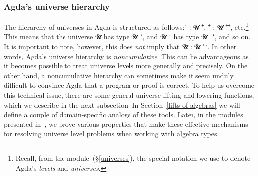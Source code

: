 \subsubsection{Agda's universe hierarchy}\label{agdas-universe-hierarchy}



The hierarchy of universes in Agda is structured as follows: \af ̇ \as : \ab 𝓤 \af ⁺\af ̇,
 \af ⁺\af ̇ \as : \ab 𝓤 \af ⁺\af ⁺\af ̇, etc.\footnote{Recall, from the  module~(\S\ref{universes}), the special notation we use to denote Agda's \textit{levels} and \textit{universes}.}
This means that the universe \ab 𝓤\af ̇ has type \ab 𝓤  \af ⁺\af ̇, and 𝓤 \af ⁺\af ̇ has type \ab 𝓤 \af ⁺\af ⁺\af ̇, and so on.  It is important to note, however, this does \emph{not} imply that \ab 𝓤\af ̇ \as : \ab 𝓤 \af ⁺\af ⁺\af ̇. In other words, Agda's universe hierarchy is \emph{noncumulative}. This can be advantageous as it becomes possible to treat universe levels more generally and precisely. On the other hand, a noncumulative hierarchy can sometimes make it seem unduly difficult to convince Agda that a program or proof is correct. To help us overcome this technical issue, there are some general universe lifting and lowering functions, which we describe in the next subsection. In Section~\ref{lifts-of-algebras} we will define a couple of domain-specific analogs of these tools.  Later, in the  modules presented in~\cite{DeMeo:2021-2,DeMeo:2021-3}, we prove various properties that make these effective mechanisms for resolving universe level problems when working with algebra types.


